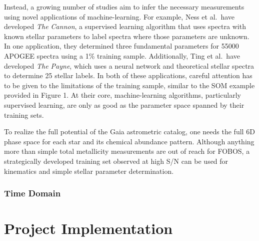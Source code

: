 \documentclass[oneside,11pt]{amsart}
\newcommand{\comment}[2][todo]{{\color{#1}[[{\bf #2}]]}}
\newcounter{chalno}
\newcommand{\chal}[1]{\refstepcounter{chalno}\label{#1}}
\begin{document}
Instead, a growing number of studies aim to infer the necessary
measurements using novel applications of machine-learning.  For example,
Ness et al.\ have developed {\it The Cannon}, a supervised learning
algorithm that uses spectra with known stellar parameters to label
spectra where those parameters are unknown.  In one application, they
determined three fundamental parameters for 55000 APOGEE spectra using a
1\% training sample.  Additionally, Ting et al.\ have developed {\it The
Payne}, which uses a neural network and theoretical stellar spectra to
determine 25 stellar labels.  In both of these applications, careful
attention has to be given to the limitations of the training sample,
similar to the SOM example provided in Figure 1.  At their core,
machine-learning algorithms, particularly supervised learning, are only
as good as the parameter space spanned by their training sets.

\medskip \chal{gaia}   To
realize the full potential of the Gaia astrometric catalog, one needs
the full 6D phase space for each star and its chemical abundance
pattern.  Although anything more than simple total metallicity
measurements are out of reach for FOBOS, a strategically developed
training set observed at high S/N can be used for kinematics and simple
stellar parameter determination.



\subsubsection{Time Domain}
\label{sec:timedomain}
\noindent \comment{1/2 page}



\section{Project Implementation}
\label{sec:project}
\end{document}
